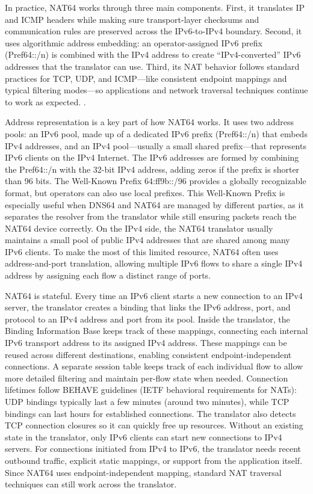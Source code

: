 In practice, NAT64 works through three main components. First, it translates IP and ICMP headers while making sure transport-layer checksums and communication rules are preserved across the IPv6-to-IPv4 boundary. Second, it uses algorithmic address embedding: an operator-assigned IPv6 prefix (Pref64::/n) is combined with the IPv4 address to create “IPv4-converted” IPv6 addresses that the translator can use. Third, its NAT behavior follows standard practices for TCP, UDP, and ICMP—like consistent endpoint mappings and typical filtering modes—so applications and network traversal techniques continue to work as expected. \cite{rfc6146,6231295}.

Address representation is a key part of how NAT64 works. It uses two address pools: an IPv6 pool, made up of a dedicated IPv6 prefix (Pref64::/n) that embeds IPv4 addresses, and an IPv4 pool—usually a small shared prefix—that represents IPv6 clients on the IPv4 Internet. The IPv6 addresses are formed by combining the Pref64::/n with the 32-bit IPv4 address, adding zeros if the prefix is shorter than 96 bits. The Well-Known Prefix 64:ff9b::/96 provides a globally recognizable format, but operators can also use local prefixes. This Well-Known Prefix is especially useful when DNS64 and NAT64 are managed by different parties, as it separates the resolver from the translator while still ensuring packets reach the NAT64 device correctly. On the IPv4 side, the NAT64 translator usually maintains a small pool of public IPv4 addresses that are shared among many IPv6 clients. To make the most of this limited resource, NAT64 often uses address-and-port translation, allowing multiple IPv6 flows to share a single IPv4 address by assigning each flow a distinct range of ports\cite{6231295,rfc6146}.

NAT64 is stateful. Every time an IPv6 client starts a new connection to an IPv4 server, the translator creates a binding that links the IPv6 address, port, and protocol to an IPv4 address and port from its pool. Inside the translator, the Binding Information Base keeps track of these mappings, connecting each internal IPv6 transport address to its assigned IPv4 address. These mappings can be reused across different destinations, enabling consistent  endpoint-independent connections. A separate session table keeps track of each individual flow to allow more detailed filtering and maintain per-flow state when needed. 
Connection lifetimes follow BEHAVE guidelines (IETF behavioral requirements for NATs): UDP bindings typically last a few minutes (around two minutes), while TCP bindings can last hours for established connections. The translator also detects TCP connection closures so it can quickly free up resources. Without an existing state in the translator, only IPv6 clients can start new connections to IPv4 servers. For connections initiated from IPv4 to IPv6, the translator needs recent outbound traffic, explicit static mappings, or support from the application itself. 
Since NAT64 uses endpoint-independent mapping, standard NAT traversal techniques can still work across the translator\cite{6231295,rfc6146}.

